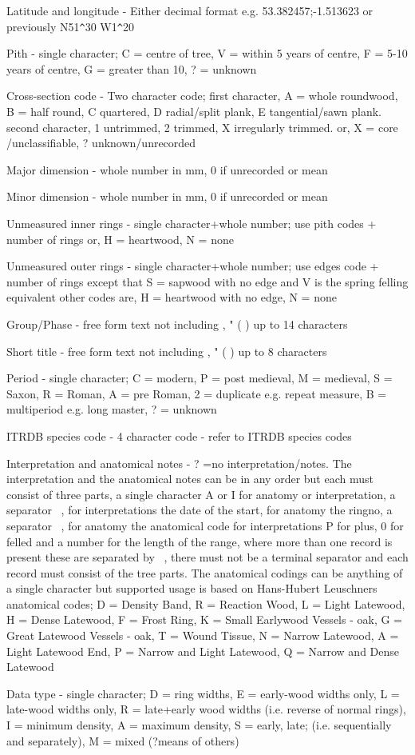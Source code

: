 \begin{enumerate*}
 \item Latitude and longitude - Either decimal format e.g. 53.382457;-1.513623 or previously N51\verb|^|30 W1\verb|^|20
 \item Pith - single character; C = centre of tree, V = within 5 years of centre, F = 5-10 years of centre, G = greater than 10, ? = unknown
 \item Cross-section code - Two character code; first character, A = whole roundwood, B = half round, C quartered, D radial/split plank, E tangential/sawn plank. second character, 1 untrimmed, 2 trimmed, X irregularly trimmed. or, X = core /unclassifiable, ? unknown/unrecorded 
 \item Major dimension - whole number in mm, 0 if unrecorded or mean
 \item Minor dimension - whole number in mm, 0 if unrecorded or mean
 \item Unmeasured inner rings - single character+whole number; use pith codes + number of rings or, H = heartwood, N = none 
 \item Unmeasured outer rings - single character+whole number; use edges code + number of rings except that S = sapwood with no edge and V is the spring felling equivalent other codes are, H = heartwood with no edge, N = none
 \item Group/Phase - free form text not including , " ( ) up to 14 characters 
 \item Short title - free form text not including , " ( ) up to 8 characters 
 \item Period - single character; C = modern, P = post medieval, M = medieval, S = Saxon, R = Roman, A = pre Roman, 2 = duplicate e.g. repeat measure, B = multiperiod e.g. long master, ? = unknown 
 \item ITRDB species code - 4 character code - refer to ITRDB species codes 
 \item Interpretation and anatomical notes - ? =no interpretation/notes. The interpretation and the anatomical notes can be in any order but each must consist of three parts, a single character A or I for anatomy or interpretation, a separator ~, for interpretations the date of the start, for anatomy the ringno, a separator ~, for anatomy the anatomical code for interpretations P for plus, 0 for felled and a number for the length of the range, where more than one record is present these are separated by ~, there must not be a terminal separator and each record must consist of the tree parts. The anatomical codings can be anything of a single character but supported usage is based on Hans-Hubert Leuschners anatomical codes; D = Density Band, R = Reaction Wood, L = Light Latewood, H = Dense Latewood, F = Frost Ring, K = Small Earlywood Vessels - oak, G = Great Latewood Vessels - oak, T = Wound Tissue, N = Narrow Latewood, A = Light Latewood End, P = Narrow and Light Latewood, Q = Narrow and Dense Latewood 
 \item Data type - single character; D = ring widths, E = early-wood widths only, L = late-wood widths only, R = late+early wood widths (i.e. reverse of normal rings), I = minimum density, A = maximum density, S = early, late; (i.e. sequentially and separately), M = mixed (?means of others)


\end{enumerate*}
